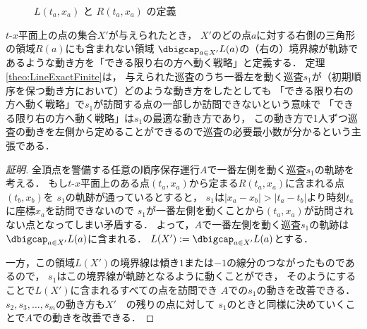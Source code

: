 \begin{figure}[h]
    \centering
    \caption{$L(t_a,x_a)$ と $R(t_a,x_a)$ の定義 \label{tikz:defLR}}
\end{figure}



$t$-$x$平面上の点の集合$X'$が与えられたとき，
$X'$のどの点$a$に対する右側の三角形の領域$R(a)$にも含まれない領域
$\dbigcap_{a \in X'} L(a)$の（右の）境界線が軌跡であるような動き方を「できる限り右の方へ動く戦略」と定義する．
%
定理\ref{theo:LineExactFinite}は，
与えられた巡査のうち一番左を動く巡査$s_1$が（初期順序を保つ動き方において）どのような動き方をしたとしても
「できる限り右の方へ動く戦略」で$s_1$が訪問する点の一部しか訪問できないという意味で
「できる限り右の方へ動く戦略」は$s_1$の最適な動き方であり，
この動き方で1人ずつ巡査の動きを左側から定めることができるので巡査の必要最小数が分かるという主張である．




\begin{proof}[証明]
全頂点を警備する任意の順序保存運行$A$で一番左側を動く巡査$s_1$の軌跡を考える．
%
もし$t$-$x$平面上のある点$(t_a,x_a)$から定まる$R(t_a,x_a)$に含まれる点$(t_b,x_b)$を
$s_1$の軌跡が通っているとすると，
$s_1$は$|x_a - x_b| > |t_a - t_b|$より時刻$t_a$に座標$x_a$を訪問できないので
$s_1$が一番左側を動くことから$(t_a,x_a)$が訪問されない点となってしまい矛盾する．
%
よって，$A$で一番左側を動く巡査$s_1$の軌跡は$\dbigcap_{a \in X'} L(a)$に含まれる．
$L(X') := \dbigcap_{a \in X'} L(a)$とする．

一方，この領域$L(X')$の境界線は傾き$1$または$-1$の線分のつながったものであるので，
$s_1$はこの境界線が軌跡となるように動くことができ，
そのようにすることで$L(X')$に含まれるすべての点を訪問でき
$A$での$s_1$の動きを改善できる．
%
$s_2, s_3, \ldots, s_m$の動き方も$X'$　の残りの点に対して
$s_1$のときと同様に決めていくことで$A$での動きを改善できる．


\end{proof}

